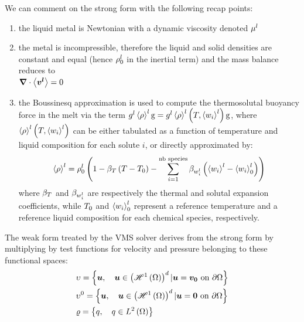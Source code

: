 We can comment on the strong form with the following recap points:
\begin{enumerate}
\itemsep0em
\item	the liquid metal is Newtonian with a dynamic viscosity denoted $\mu^l$
\item	the metal is incompressible, therefore the liquid and solid densities are constant and equal (hence
		$\rho_{0}^{l}$ in the inertial term) and the mass balance reduces to \\ $\boldsymbol{\nabla} \cdot \left \langle \boldsymbol{v^l} \right \rangle =0$
\item	the Boussinesq approximation is used to compute the thermosolutal buoyancy force in the melt
		via the term ${g^l} \left \langle \rho \right \rangle^l \boldsymbol{\text{g}} = {g^l} \left \langle \rho \right \rangle^l \left( T,\left \langle w_i \right \rangle^l \right) \boldsymbol{\text{g}}$, where $\left \langle \rho \right \rangle^l \left( T,\left \langle w_i \right \rangle^l \right)$
		can be either tabulated as a function of temperature and liquid composition for each solute $i$, or directly 
		approximated by:
		\begin{align}
		\label{eq:boussinesq}
 		\left \langle \rho \right \rangle^l = \rho_{0}^{l} \left( 1-\beta_T \left( T-T_{0} \right)- \sum_{i=1}^{\text{nb species}} \beta_{w_i^l} \left( \left \langle w_i \right \rangle^l-\left \langle w_i \right \rangle_{0}^l \right) \right)
		\end{align}
		where $\beta_T$ and $\beta_{w_i^l}$ are respectively the thermal and solutal expansion coefficients, while
		$T_{0}$ and $\left \langle w_i \right \rangle_{0}^l$ represent a reference temperature and a reference liquid composition for each chemical species, respectively.
\end{enumerate}
The weak form treated by the VMS solver derives from the strong form by multiplying
by test functions for velocity and pressure belonging to these functional spaces:
\begin{align*}
& \upsilon = \left\{ \boldsymbol{u}, \quad \boldsymbol{u} \in \left( \mathscr{H}^1 \left( \Omega \right) \right)^d | \boldsymbol{u} = \boldsymbol{v_0} \text{ on } \partial \Omega  \right\} \\
& \upsilon^0 = \left\{ \boldsymbol{u}, \quad \boldsymbol{u} \in \left( \mathscr{H}^1 \left( \Omega \right) \right)^d | \boldsymbol{u} = \boldsymbol{0} \text{ on } \partial \Omega  \right\} \\
& \varrho = \left\{ q, \quad q \in L^2 \left( \Omega \right) \right\}
\end{align*}
